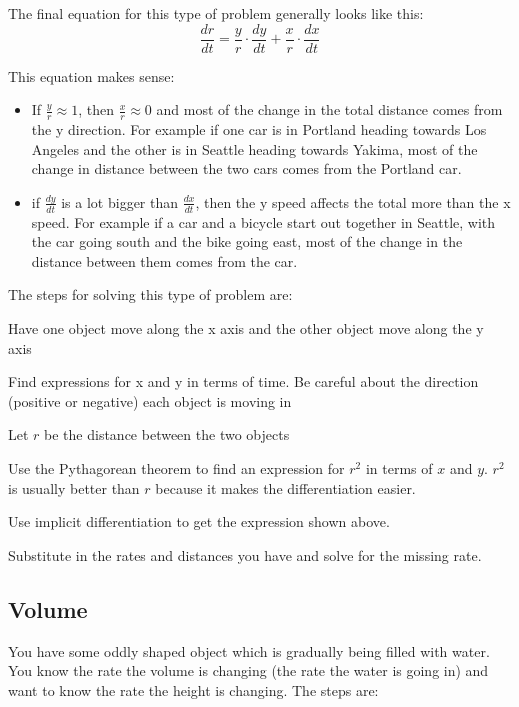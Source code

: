 \documentclass[fleqn]{exam}
\begin{document}
The final equation for this type of problem generally looks like this:
\[
  \frac{dr}{dt} = \frac{y}{r} \cdot \frac{dy}{dt} + \frac{x}{r} \cdot \frac{dx}{dt}
\]

This equation makes sense:
\begin{itemize}
  \item If $\frac{y}{r} \approx 1$, then $\frac{x}{r} \approx 0$ and most of the change in the total distance comes from
    the y direction.  For example if one car is in Portland heading towards Los Angeles and the other is in Seattle
    heading towards Yakima, most of the change in distance between the two cars comes from the Portland car.

  \item if $\frac{dy}{dt}$ is a lot bigger than $\frac{dx}{dt}$, then the y speed affects the total more than the x
    speed.  For example if a car and a bicycle start out together in Seattle, with the car going south and the bike
    going east, most of the change in the distance between them comes from the car.
 
\end{itemize}

The steps for solving this type of problem are:
\begin{itemize*}
  \item Have one object move along the x axis and the other object move along the y axis
  \item Find expressions for x and y in terms of time.  Be careful about the direction (positive or negative) each
    object is moving in
  \item Let $r$ be the distance between the two objects
  \item Use the Pythagorean theorem to find an expression for $r^2$ in terms of $x$ and $y$.  $r^2$ is usually better
    than $r$ because it makes the differentiation easier.
  \item Use implicit differentiation to get the expression shown above.
  \item Substitute in the rates and distances you have and solve for the missing rate.
\end{itemize*}

\subsection{Volume}

You have some oddly shaped object which is gradually being filled with water.  You know the rate the volume is changing
(the rate the water is going in) and want to know the rate the height is changing.  The steps are:
\end{document}
